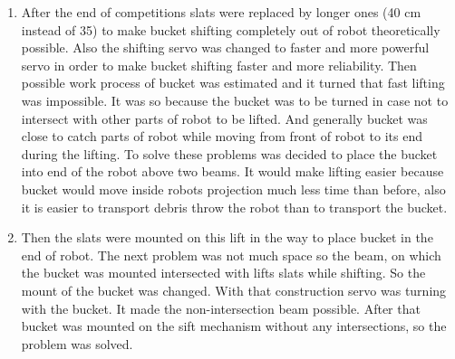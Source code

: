 \begin{enumerate}
  \item After the end of competitions slats were replaced by longer ones (40 cm instead of 35) to make bucket shifting completely out of robot theoretically possible. Also the shifting servo was changed to faster and more powerful servo in order to make bucket shifting faster and more reliability. Then possible work process of bucket was estimated and it turned that fast lifting was impossible. It was so because the bucket was to be turned in case not to intersect with other parts of robot to be lifted. And generally bucket was close to catch parts of robot while moving from front of robot to its end during the lifting. To solve these problems was decided to place the bucket into end of the robot above two beams. It would make lifting easier because bucket would move inside robots projection much less time than before, also it is easier to transport debris throw the robot than to transport the bucket.
  
  \item Then the slats were mounted on this lift in the way to place bucket in the end of robot. The next problem was not much space so the beam, on which the bucket was mounted intersected with lifts slats while shifting. So the mount of the bucket was changed. 
  With that construction servo was turning with the bucket. It made the non-intersection beam possible. After that bucket was mounted on the sift mechanism without any intersections, so the problem was solved.
  

\end{enumerate}
